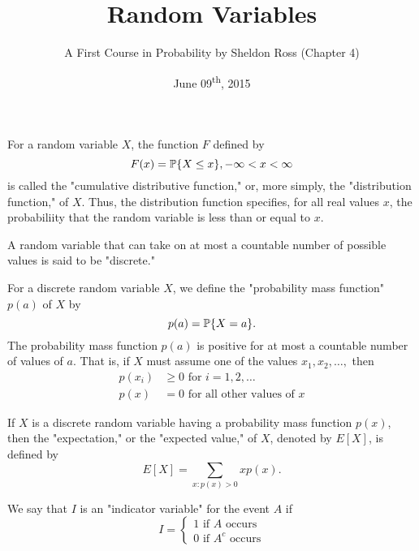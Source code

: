 \documentclass[a4paper,11pt]{article}
\title{Random Variables}
\author{A First Course in Probability by Sheldon Ross (Chapter 4)}
\date{June 09\textsuperscript{th}, 2015}
\begin{document}
\maketitle
{}

\begin{outline}

    For a random variable \(X\), the function \(F\) defined by \[F(x)=\bbp[X\leq x], -\infty < x < \infty\]
    is called the "cumulative distributive function," or, more simply, the "distribution function," of \(X\). 
    Thus, the distribution function specifies, for all real values \(x\), the probabiliity that the random 
    variable is less than or equal to \(x\).
    
    A random variable that can take on at most a countable number of possible values is said to be "discrete."
    
    For a discrete random variable \(X\), we define the "probability mass function" \(p(a)\) of \(X\) by 
    \[p(a) = \bbp[X=a]\text{.}\] The probability mass function \(p(a)\) is positive for at most a countable 
    number of values of \(a\). That is, if \(X\) must assume one of the values \(x_1, x_2, \ldots,\) then 
    \begin{align*}
      p(x_i) &\geq 0\text{ for }i = 1, 2, \ldots \\
      p(x) &= 0\text{ for all other values of }x
    \end{align*}
    
    If \(X\) is a discrete random variable having a probability mass function \(p(x)\), then the "expectation," or the "expected value," of \(X\), denoted by \(E[X]\), is defined by \[E[X] = \sum_{x:p(x)>0}xp(x)\text{.}\]
    
    We say that \(I\) is an "indicator variable" for the event \(A\) if 
    \[ I = \begin{cases} 
             1 \text{ if } A \text{ occurs} \\
             0 \text{ if } A^c \text{ occurs}
       \end{cases}
    \]

\end{outline}
\end{document}

